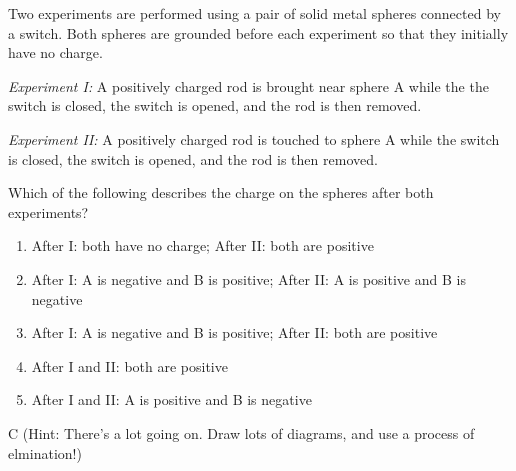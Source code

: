 \newpage
\begin{question}
Two experiments are performed using a pair of solid metal spheres connected by a switch. Both spheres are grounded before each experiment so that they initially have no charge.

\emph{Experiment I:} A positively charged rod is brought near sphere A while the the switch is closed, the switch is opened, and the rod is then removed.

\emph{Experiment II:} A positively charged rod is touched to sphere A while the switch is closed, the switch is opened, and the rod is then removed.

Which of the following describes the charge on the spheres after both experiments?
\begin{enumerate}[label=(\alph*)]
    \item After I: both have no charge; After II: both are positive
    \item After I: A is negative and B is positive; After II: A is positive and B is negative
    \item After I: A is negative and B is positive; After II: both are positive
    \item After I and II: both are positive
    \item After I and II: A is positive and B is negative
\end{enumerate}

\end{question}

\begin{solution}
C (Hint: There's a lot going on. Draw lots of diagrams, and use a process of elmination!)
\end{solution}

